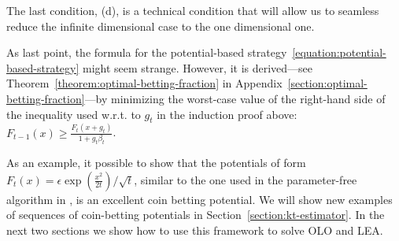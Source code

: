The last condition, (d), is a technical condition that will allow us to seamless reduce the infinite dimensional case to the one dimensional one.

As last point, the formula for the potential-based
strategy~\eqref{equation:potential-based-strategy} might seem strange. However,
it is derived---see Theorem~\ref{theorem:optimal-betting-fraction} in
Appendix~\ref{section:optimal-betting-fraction}---by minimizing the worst-case value of the right-hand side of the
inequality used w.r.t. to $g_t$ in the induction proof above: $F_{t-1}(x) \ge \tfrac{F_{t}(x + g_t)}{1+g_t\beta_t}$.

As an example, it possible to show that the potentials of form $F_t(x)=\epsilon \exp
\left(\tfrac{x^2}{2t}\right)/\sqrt{t}$, similar to the one used in the parameter-free algorithm in \cite{McMahan-Orabona-2014}, is an excellent coin betting potential.
We will show new examples of sequences of coin-betting potentials in
Section~\ref{section:kt-estimator}. In the next two sections we show how to use
this framework to solve \ac{OLO} and \ac{LEA}.
